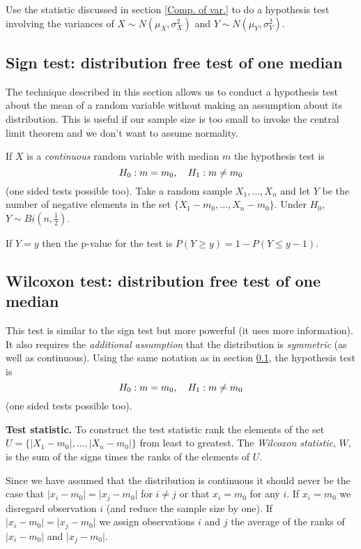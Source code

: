\documentclass[10pt, two column]{article}
\begin{document}
Use the statistic discussed in section \ref{Comp. of var.} to do a hypothesis test involving the variances of $X \sim N(\mu_{X}, \sigma_{X}^{2})$ and $Y \sim N(\mu_{Y}, \sigma_{Y}^{2})$.  

\subsection{Sign test: distribution free test of one median} \label{sign test}

The technique described in this section allows us to conduct a hypothesis test about the mean of a random variable without making an assumption about its distribution. This is useful if our sample size is too small to invoke the central limit theorem and we don't want to assume normality. 

If $X$ is a \emph{continuous} random variable with median $m$ the hypothesis test is \vspace{-6pt}
\[
H_{0}: m = m_{0}, \quad H_{1}: m \neq m_{0} \vspace{-6pt}
\]
(one sided tests possible too). Take a random sample $X_{1}, \dots, X_{n}$ and let $Y$ be the number of negative elements in the set $\{X_{1} - m_{0}, \dots, X_{n} - m_{0} \}$. Under $H_{0}$, $Y \sim Bi(n, \frac{1}{2})$. 

If $Y=y$ then the p-value for the test is $P(Y \geq y) = 1 - P(Y\leq y - 1)$. 

\subsection{Wilcoxon test: distribution free test of one median}

This test is similar to the sign test but more powerful (it uses more information). It also requires the \emph{additional assumption} that the distribution is \emph{symmetric} (as well as continuous). Using the same notation as in section \ref{sign test}, the hypothesis test is \vspace{-6pt}
\[
H_{0}: m = m_{0}, \quad H_{1}: m \neq m_{0} \vspace{-6pt}
\]
(one sided tests possible too). 

{\bf Test statistic.} To construct the test statistic rank the elements of the set $U = \{ \vert X_{1} - m_{0} \vert, \dots, \vert X_{n} - m_{0} \vert \}$ from least to greatest. The \emph{Wilcoxon statistic}, $W$, is the sum of the signs times the ranks of the elements of $U$. 

Since we have assumed that the distribution is continuous it should never be the case that $\vert x_{i} - m_{0} \vert = \vert x_{j} - m_{0} \vert$ for $i \neq j$ or that $x_{i} = m_{0}$ for any $i$. If $x_{i} = m_{0}$ we disregard observation $i$ (and reduce the sample size by one). If $\vert x_{i} - m_{0} \vert = \vert x_{j} - m_{0} \vert$ we assign observations $i$ and $j$ the average of the ranks of $\vert x_{i} - m_{0} \vert$ and $\vert x_{j} - m_{0} \vert$. 
\end{document}
